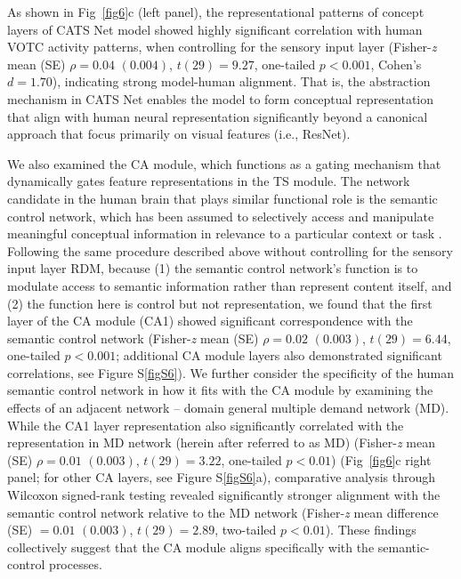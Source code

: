 \documentclass[pdflatex,sn-mathphys-num,lineno]{sn-jnl}%
\begin{document}
\begin{CJK}{UTF8}{gbsn}
As shown in Fig~\ref{fig6}c (left panel), the representational patterns of concept layers of CATS Net model showed highly significant correlation with human VOTC activity patterns, when controlling for the sensory input layer (Fisher-\textit{z} mean (SE) $\rho = 0.04$ $(0.004)$, $t(29) = 9.27$, one-tailed $p < 0.001$, Cohen's $d = 1.70$), indicating strong model-human alignment. That is, the abstraction mechanism in CATS Net enables the model to form conceptual representation that align with human neural representation significantly beyond a canonical approach that focus primarily on visual features (i.e., ResNet).

We also examined the CA module, which functions as a gating mechanism that dynamically gates feature representations in the TS module. The network candidate in the human brain that plays similar functional role is the semantic control network, which has been assumed to selectively access and manipulate meaningful conceptual information in relevance to a particular context or task \cite{jackson_neural_2021}. Following the same procedure described above without controlling for the sensory input layer RDM, because (1) the semantic control network's function is to modulate access to semantic information rather than represent content itself, and (2) the function here is control but not representation, we found that the first layer of the CA module (CA1) showed significant correspondence with the semantic control network (Fisher-\textit{z} mean (SE) $\rho = 0.02$ $(0.003)$, $t(29) = 6.44$, one-tailed $p < 0.001$; additional CA module layers also demonstrated significant correlations, see Figure S\ref{figS6}). We further consider the specificity of the human semantic control network in how it fits with the CA module by examining the effects of an adjacent network – domain general multiple demand network (MD). While the CA1 layer representation also significantly correlated with the representation in MD network (herein after referred to as MD) \cite{fedorenko_broad_2013} (Fisher-\textit{z} mean (SE) $\rho = 0.01$ $(0.003)$, $t(29) = 3.22$, one-tailed $p < 0.01$) (Fig~\ref{fig6}c right panel; for other CA layers, see Figure S\ref{figS6}a), comparative analysis through Wilcoxon signed-rank testing revealed significantly stronger alignment with the semantic control network relative to the MD network (Fisher-\textit{z} mean difference (SE) $= 0.01$ $(0.003)$, $t(29) = 2.89$, two-tailed $p < 0.01$). These findings collectively suggest that the CA module aligns specifically with the semantic-control processes.


\end{CJK}
\end{document}
